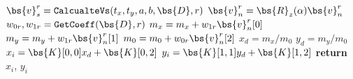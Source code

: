 \begin{algorithm}[h]
\begin{algorithmic}[1]
        \State $\bs{v}_s^r = \texttt{CalcualteVs}(t_x, t_y, a, b ,\bs{D},r)$\quad{}
        \vspace{1mm}
        \State $\bs{v}_n^r = \bs{R}_{z}(\alpha)\bs{v}_n^r$\quad{}
        \State $w_{0r}, w_{1r} = \texttt{GetCoeff}(\bs{D},r)$\quad{}
        \State $m_x = m_x + w_{1r}\bs{v}_n^r[0]$
        \State $m_y = m_y + w_{1r}\bs{v}_n^r[1]$
        \State $m_0 = m_0 + w_{0r}\bs{v}_n^r[2]$
    \EndFor
    \State $x_d = m_x/m_0$
    \State $y_d = m_y/m_0$
    \State $x_i = \bs{K}[0,0]x_d+\bs{K}[0,2]$
    \State $y_i = \bs{K}[1,1]y_d+\bs{K}[1,2]$
    \State \textbf{return} $x_i$, $y_i$
    \end{algorithmic}
\end{algorithm}
